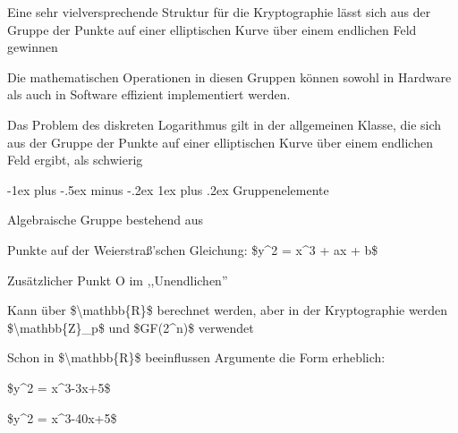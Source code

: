 \documentclass[a4paper]{article}
\makeatletter
\renewcommand{\subsubsection}{\@startsection{subsubsection}{3}{0mm}%
 {-1ex plus -.5ex minus -.2ex}%
 {1ex plus .2ex}%
 {\normalfont\small\bfseries}}
\makeatother
\begin{document}
\begin{multicols}{3}
\begin{itemize*}
\begin{itemize*}
            \end{itemize*}
            \item Eine sehr vielversprechende Struktur für die Kryptographie lässt sich
            aus der Gruppe der Punkte auf einer elliptischen Kurve über einem
            endlichen Feld gewinnen
            \begin{itemize*}
                  \item Die mathematischen Operationen in diesen Gruppen können sowohl in Hardware als auch in Software effizient implementiert werden.
                  \item Das Problem des diskreten Logarithmus gilt in der allgemeinen Klasse, die sich aus der Gruppe der Punkte auf einer elliptischen Kurve über einem endlichen Feld ergibt, als schwierig
            \end{itemize*}
      \end{itemize*}


      \subsubsection{Gruppenelemente}

      \begin{itemize*}
            \item Algebraische Gruppe bestehend aus
            \begin{itemize*}
                  \item Punkte auf der Weierstraß'schen Gleichung: \$y\^{}2 = x\^{}3 + ax + b\$
                  \item Zusätzlicher Punkt O im ,,Unendlichen''
            \end{itemize*}
            \item Kann über \$\textbackslash mathbb\{R\}\$ berechnet werden, aber in der
            Kryptographie werden \$\textbackslash mathbb\{Z\}\_p\$ und
            \$GF(2\^{}n)\$ verwendet
            \begin{itemize*}
                  \item Schon in \$\textbackslash mathbb\{R\}\$ beeinflussen Argumente die Form erheblich:
                  \begin{itemize*}
                        \item \$y\^{}2 = x\^{}3-3x+5\$ %
                        \item \$y\^{}2 = x\^{}3-40x+5\$ %
                  \end{itemize*}
            \end{itemize*}
      \end{itemize*}


\end{multicols}
\end{document}
